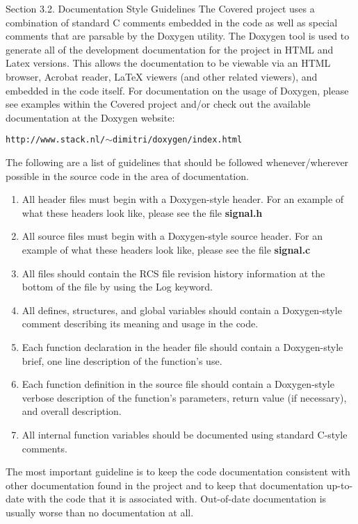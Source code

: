 \begin{Desc}
\item[Section 3.2. Documentation Style Guidelines]The Covered project uses a combination of standard C comments embedded in the code as well as special comments that are parsable by the Doxygen utility. The Doxygen tool is used to generate all of the development documentation for the project in HTML and Latex versions. This allows the documentation to be viewable via an HTML browser, Acrobat reader, La\-Te\-X viewers (and other related viewers), and embedded in the code itself. For documentation on the usage of Doxygen, please see examples within the Covered project and/or check out the available documentation at the Doxygen website:\end{Desc}
\begin{Desc}
\item[]{\tt http://www.stack.nl/$\sim$dimitri/doxygen/index.html}\end{Desc}
\begin{Desc}
\item[]The following are a list of guidelines that should be followed whenever/wherever possible in the source code in the area of documentation.\end{Desc}
\begin{Desc}
\item[]\begin{enumerate}
\item All header files must begin with a Doxygen-style header. For an example of what these headers look like, please see the file {\bf signal.h}\item All source files must begin with a Doxygen-style source header. For an example of what these headers look like, please see the file {\bf signal.c}\item All files should contain the RCS file revision history information at the bottom of the file by using the Log keyword.\item All defines, structures, and global variables should contain a Doxygen-style comment describing its meaning and usage in the code.\item Each function declaration in the header file should contain a Doxygen-style brief, one line description of the function's use.\item Each function definition in the source file should contain a Doxygen-style verbose description of the function's parameters, return value (if necessary), and overall description.\item All internal function variables should be documented using standard C-style comments.\end{enumerate}
\end{Desc}
\begin{Desc}
\item[]The most important guideline is to keep the code documentation consistent with other documentation found in the project and to keep that documentation up-to-date with the code that it is associated with. Out-of-date documentation is usually worse than no documentation at all.\end{Desc}




